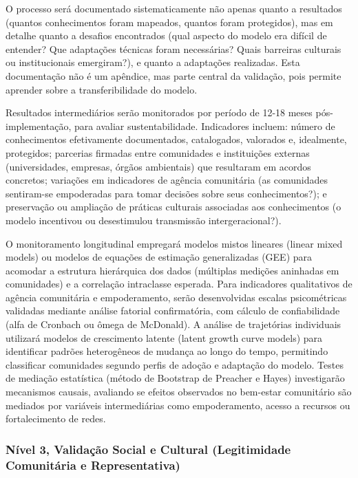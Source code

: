 O processo será documentado sistematicamente não apenas quanto a resultados (quantos conhecimentos foram mapeados, quantos foram protegidos), mas em detalhe quanto a desafios encontrados (qual aspecto do modelo era difícil de entender? Que adaptações técnicas foram necessárias? Quais barreiras culturais ou institucionais emergiram?), e quanto a adaptações realizadas. Esta documentação não é um apêndice, mas parte central da validação, pois permite aprender sobre a transferibilidade do modelo.

Resultados intermediários serão monitorados por período de 12-18 meses pós-implementação, para avaliar sustentabilidade. Indicadores incluem: número de conhecimentos efetivamente documentados, catalogados, valorados e, idealmente, protegidos; parcerias firmadas entre comunidades e instituições externas (universidades, empresas, órgãos ambientais) que resultaram em acordos concretos; variações em indicadores de agência comunitária (as comunidades sentiram-se empoderadas para tomar decisões sobre seus conhecimentos?); e preservação ou ampliação de práticas culturais associadas aos conhecimentos (o modelo incentivou ou desestimulou transmissão intergeracional?).

O monitoramento longitudinal empregará modelos mistos lineares (linear mixed models) ou modelos de equações de estimação generalizadas (GEE) para acomodar a estrutura hierárquica dos dados (múltiplas medições aninhadas em comunidades) e a correlação intraclasse esperada. Para indicadores qualitativos de agência comunitária e empoderamento, serão desenvolvidas escalas psicométricas validadas mediante análise fatorial confirmatória, com cálculo de confiabilidade (alfa de Cronbach ou ômega de McDonald). A análise de trajetórias individuais utilizará modelos de crescimento latente (latent growth curve models) para identificar padrões heterogêneos de mudança ao longo do tempo, permitindo classificar comunidades segundo perfis de adoção e adaptação do modelo. Testes de mediação estatística (método de Bootstrap de Preacher e Hayes) investigarão mecanismos causais, avaliando se efeitos observados no bem-estar comunitário são mediados por variáveis intermediárias como empoderamento, acesso a recursos ou fortalecimento de redes.

\subsubsection{Nível 3, Validação Social e Cultural (Legitimidade Comunitária e Representativa)}

